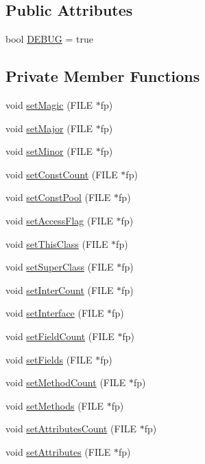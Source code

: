 \subsection*{Public Attributes}
\begin{DoxyCompactItemize}
\item 
bool \hyperlink{class_class_loader_a0aa9112b221bbc7680236be7eb5b4c45}{D\+E\+B\+UG} = true
\end{DoxyCompactItemize}
\subsection*{Private Member Functions}
\begin{DoxyCompactItemize}
\item 
void \hyperlink{class_class_loader_a9e756ef58a13aab63472a9b343710327}{set\+Magic} (F\+I\+LE $\ast$fp)
\item 
void \hyperlink{class_class_loader_afd21ab61a4ea4d2fda29319e37a7886e}{set\+Major} (F\+I\+LE $\ast$fp)
\item 
void \hyperlink{class_class_loader_ad2bd2b993bdbc080f77a9f5e76744fd7}{set\+Minor} (F\+I\+LE $\ast$fp)
\item 
void \hyperlink{class_class_loader_a22735292f1ed1c1b101111f013524a06}{set\+Const\+Count} (F\+I\+LE $\ast$fp)
\item 
void \hyperlink{class_class_loader_a09a097315d78f50dc7522811e256978f}{set\+Const\+Pool} (F\+I\+LE $\ast$fp)
\item 
void \hyperlink{class_class_loader_a78a667283feda0933eabf1d8f601fa30}{set\+Access\+Flag} (F\+I\+LE $\ast$fp)
\item 
void \hyperlink{class_class_loader_aa089d3175ca27ac5e0efa2f6c26c4df5}{set\+This\+Class} (F\+I\+LE $\ast$fp)
\item 
void \hyperlink{class_class_loader_a011a4cfdd1995fa34718a549ca467b0a}{set\+Super\+Class} (F\+I\+LE $\ast$fp)
\item 
void \hyperlink{class_class_loader_a25c897efbe0542a8603f2dfa29943881}{set\+Inter\+Count} (F\+I\+LE $\ast$fp)
\item 
void \hyperlink{class_class_loader_a18bc96df21925d9da172c64205736ea5}{set\+Interface} (F\+I\+LE $\ast$fp)
\item 
void \hyperlink{class_class_loader_aedeaf814e3cf232978ce7e0b135c93b0}{set\+Field\+Count} (F\+I\+LE $\ast$fp)
\item 
void \hyperlink{class_class_loader_a3a544b1a25a445bbf4ce7e5d84a2a90a}{set\+Fields} (F\+I\+LE $\ast$fp)
\item 
void \hyperlink{class_class_loader_aa744ed99b82e912547af903ea13fa3dd}{set\+Method\+Count} (F\+I\+LE $\ast$fp)
\item 
void \hyperlink{class_class_loader_ab47e37f5d359a067182c1a181e9db54e}{set\+Methods} (F\+I\+LE $\ast$fp)
\item 
void \hyperlink{class_class_loader_ae1dff6712251163173291991f52ac8fa}{set\+Attributes\+Count} (F\+I\+LE $\ast$fp)
\item 
void \hyperlink{class_class_loader_adac675675241b8c2892ebfbf5b902d33}{set\+Attributes} (F\+I\+LE $\ast$fp)
\end{DoxyCompactItemize}
